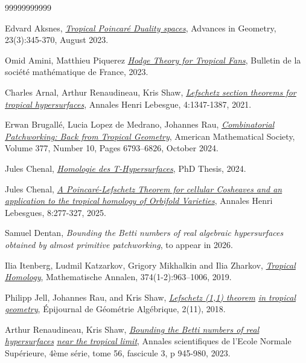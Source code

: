\documentclass{article}
\begin{document}
\begin{thebibliography}{99999999999}

 Edvard Aksnes, \emph{\href{https://arxiv.org/abs/2112.03680}{Tropical Poincaré Duality spaces}}, Advances in Geometry, 23(3):345-370, August 2023.

 Omid Amini, Matthieu Piquerez \emph{\href{http://omid.amini.perso.math.cnrs.fr/Publications/hodge-theory-tropical-fans.pdf}{Hodge Theory for Tropical Fans}}, Bulletin de la société mathématique de France, 2023.

 Charles Arnal, Arthur Renaudineau, Kris Shaw, \emph{\href{https://arxiv.org/abs/1907.06420}{Lefschetz section theorems for}} \emph{\href{https://arxiv.org/abs/1907.06420}{tropical hypersurfaces}}, Annales Henri Lebesgue, 4:1347-1387, 2021.

 Erwan Brugallé, Lucia Lopez de Medrano, Johannes Rau, \emph{\href{https://arxiv.org/pdf/1604.01838}{Combinatorial Patchworking: Back from Tropical Geometry}}, American Mathematical Society, Volume 377, Number 10, Pages 6793–6826, October 2024.

 Jules Chenal, \emph{\href{https://theses.hal.science/tel-04791180v1}{Homologie des T-Hypersurfaces}}, PhD Thesis, 2024.

 Jules Chenal, \emph{\href{https://arxiv.org/pdf/2308.08548}{A Poincaré-Lefschetz Theorem for cellular Cosheaves and an} \href{https://arxiv.org/pdf/2308.08548}{application to the tropical homology of Orbifold Varieties}}, Annales Henri Lebesgues, 8:277-327, 2025.

 Samuel Dentan, \emph{Bounding the Betti numbers of real algebraic hypersurfaces obtained by almost primitive patchworking}, to appear in 2026.

 Ilia Itenberg, Ludmil Katzarkov, Grigory Mikhalkin and Ilia Zharkov, \emph{\href{https://arxiv.org/pdf/1604.01838.pdf}{Tropical Homology}}, Mathematische Annalen, 374(1-2):963–1006, 2019.

 Philipp Jell, Johannes Rau, and Kris Shaw, \emph{\href{https://arxiv.org/abs/1711.07900.pdf}{Lefschetz (1,1) theorem} \href{https://arxiv.org/abs/1711.07900.pdf}{in tropical geometry}}, Épijournal de Géométrie Algébrique, 2(11), 2018.

 Arthur Renaudineau, Kris Shaw, \emph{\href{https://arxiv.org/pdf/1805.02030}{Bounding the Betti numbers of real hypersurfaces}} \emph{\href{https://arxiv.org/pdf/1805.02030}{near the tropical limit}}, Annales scientifiques de l'Ecole Normale Supérieure, 4ème série, tome 56, fascicule 3, p 945-980, 2023.


\end{thebibliography}
\end{document}
